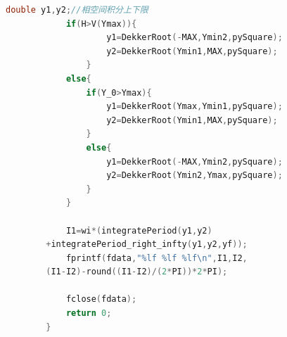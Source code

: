 \documentclass[10pt, a4paper]{article}
\begin{document}
\begin{lstlisting}[language=C]
            double y1,y2;//相空间积分上下限
            if(H>V(Ymax)){
                    y1=DekkerRoot(-MAX,Ymin2,pySquare);
                    y2=DekkerRoot(Ymin1,MAX,pySquare);
                }
            else{
                if(Y_0>Ymax){
                    y1=DekkerRoot(Ymax,Ymin1,pySquare);
                    y2=DekkerRoot(Ymin1,MAX,pySquare);
                }
                else{
                    y1=DekkerRoot(-MAX,Ymin2,pySquare);
                    y2=DekkerRoot(Ymin2,Ymax,pySquare);
                }
            }

            I1=wi*(integratePeriod(y1,y2)
        +integratePeriod_right_infty(y1,y2,yf));
            fprintf(fdata,"%lf %lf %lf\n",I1,I2,
        (I1-I2)-round((I1-I2)/(2*PI))*2*PI);

            fclose(fdata);
            return 0;
        }

    \end{lstlisting}
\end{document}
